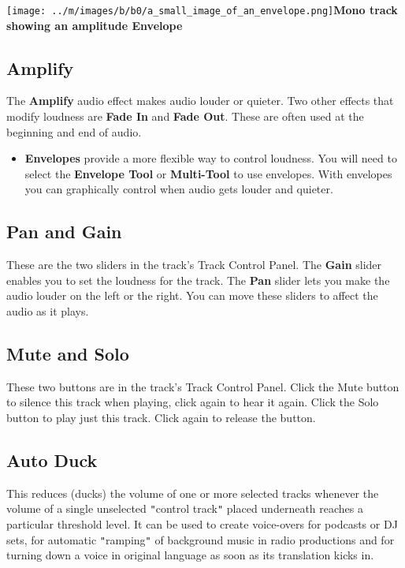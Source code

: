 \documentclass[twocolumn]{book}
\begin{document}
\texttt{[image: ../m/images/b/b0/a\_small\_image\_of\_an\_envelope.png]}\textbf{Mono track showing an amplitude Envelope}

\subsection{Amplify}


The \textbf{Amplify} audio effect makes audio louder or quieter.  Two other effects that modify loudness are \textbf{Fade In} and \textbf{Fade Out}.  These are often used at the beginning and end of audio. 
\begin{itemize}
\item  \textbf{Envelopes} provide a more flexible way to control loudness.  You will need to select the \textbf{Envelope Tool} or \textbf{Multi-Tool} to use envelopes.  With envelopes you can graphically control when audio gets louder and quieter.
\end{itemize}

\subsection{Pan and Gain}


These are the two sliders in the track's Track Control Panel. The \textbf{Gain} slider enables you to set the loudness for the track.  The \textbf{Pan} slider lets you make the audio louder on the left or the right. You can move these sliders to affect the audio as it plays.

\subsection{Mute and Solo}


These two buttons are in the track's Track Control Panel. Click the Mute button to silence this track when playing, click again to hear it again. Click the Solo button to play just this track. Click again to release the button. 

\subsection{Auto Duck}


This reduces (ducks) the volume of one or more selected tracks whenever the volume of a single unselected \texttt{{}"{}}control track\texttt{{}"{}} placed underneath reaches a particular threshold level. It can be used to create voice-overs for podcasts or DJ sets, for automatic \texttt{{}"{}}ramping\texttt{{}"{}} of background music in radio productions and for turning down a voice in original language as soon as its translation kicks in.
\end{document}
